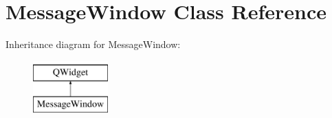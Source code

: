\hypertarget{classMessageWindow}{}\section{Message\+Window Class Reference}
\label{classMessageWindow}
Inheritance diagram for Message\+Window\+:\begin{figure}[H]
\begin{center}
\leavevmode
\includegraphics[height=2.000000cm]{d4/d20/classMessageWindow}
\end{center}
\end{figure}
